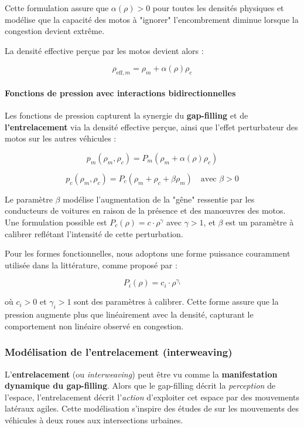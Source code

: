 Cette formulation assure que $\alpha(\rho) > 0$ pour toutes les densités physiques et modélise que la capacité des motos à "ignorer" l'encombrement diminue lorsque la congestion devient extrême.

La densité effective perçue par les motos devient alors :

\begin{equation}
\rho_{\text{eff},m} = \rho_m + \alpha(\rho) \rho_c
\end{equation}

\paragraph{Fonctions de pression avec interactions bidirectionnelles}
Les fonctions de pression capturent la synergie du \textbf{gap-filling} et de \textbf{l'entrelacement} via la densité effective perçue, ainsi que l'effet perturbateur des motos sur les autres véhicules :

\begin{equation}
p_m(\rho_m, \rho_c) = P_m(\rho_m + \alpha(\rho) \rho_c)
\end{equation}

\begin{equation}
p_c(\rho_m, \rho_c) = P_c(\rho_m + \rho_c + \beta \rho_m) \quad \text{avec } \beta > 0
\end{equation}

Le paramètre $\beta$ modélise l'augmentation de la "gêne" ressentie par les conducteurs de voitures en raison de la présence et des manœuvres des motos. Une formulation possible est $P_c(\rho) = c \cdot \rho^\gamma$ avec $\gamma > 1$, et $\beta$ est un paramètre à calibrer reflétant l'intensité de cette perturbation.

Pour les formes fonctionnelles, nous adoptons une forme puissance couramment utilisée dans la littérature, comme proposé par \cite{Aw2000} :

\begin{equation}
P_i(\rho) = c_i \cdot \rho^{\gamma_i}
\end{equation}

où $c_i > 0$ et $\gamma_i > 1$ sont des paramètres à calibrer. Cette forme assure que la pression augmente plus que linéairement avec la densité, capturant le comportement non linéaire observé en congestion.

\subsubsection{Modélisation de l'entrelacement (interweaving)}
L'\textbf{entrelacement} (ou \textit{interweaving}) peut être vu comme la \textbf{manifestation dynamique du gap-filling}. Alors que le gap-filling décrit la \textit{perception} de l'espace, l'entrelacement décrit l'\textit{action} d'exploiter cet espace par des mouvements latéraux agiles. Cette modélisation s'inspire des études de \cite{Sermpis2005} sur les mouvements des véhicules à deux roues aux intersections urbaines.

